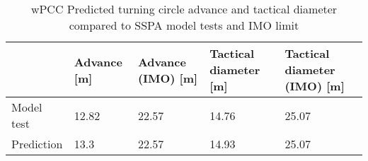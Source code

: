 \begin{table}[h]
    \footnotesize
    \caption{wPCC Predicted turning circle advance and tactical diameter compared to SSPA model tests and IMO limit}
    \label{\detokenize{06.10_results_wpcc:tab-wpcc-advance}}
    \centering
    \begin{tabular}{|T|T|T|T|T|}
\hline
&

Advance {[}m{]}
&

Advance (IMO) {[}m{]}
&

Tactical diameter {[}m{]}
&

Tactical diameter (IMO) {[}m{]}
\\
\hline

Model test
&

12.82
&

22.57
&

14.76
&

25.07
\\
\hline

Prediction
&

13.3
&

22.57
&

14.93
&

25.07
\\
\hline
\end{tabular}

\end{table}

